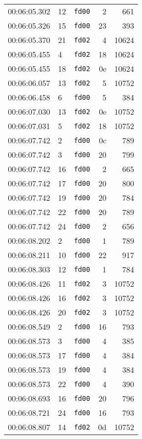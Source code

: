 \documentclass{article}
\begin{document}
\begin{longtable}{lllrr}
00:06:05.302 & 12 & \texttt{fd00} & 2 & 661 \\
00:06:05.326 & 15 & \texttt{fd00} & 23 & 393 \\
00:06:05.370 & 21 & \texttt{fd02} & 4 & 10624 \\
00:06:05.455 & 4 & \texttt{fd02} & 18 & 10624 \\
00:06:05.455 & 18 & \texttt{fd02} & 0e & 10624 \\
00:06:06.057 & 13 & \texttt{fd02} & 5 & 10752 \\
00:06:06.458 & 6 & \texttt{fd00} & 5 & 384 \\
00:06:07.030 & 13 & \texttt{fd02} & 0e & 10752 \\
00:06:07.031 & 5 & \texttt{fd02} & 18 & 10752 \\
00:06:07.742 & 2 & \texttt{fd00} & 0c & 789 \\
00:06:07.742 & 3 & \texttt{fd00} & 20 & 799 \\
00:06:07.742 & 16 & \texttt{fd00} & 2 & 665 \\
00:06:07.742 & 17 & \texttt{fd00} & 20 & 800 \\
00:06:07.742 & 19 & \texttt{fd00} & 20 & 784 \\
00:06:07.742 & 22 & \texttt{fd00} & 20 & 789 \\
00:06:07.742 & 24 & \texttt{fd00} & 2 & 656 \\
00:06:08.202 & 2 & \texttt{fd00} & 1 & 789 \\
00:06:08.211 & 10 & \texttt{fd00} & 22 & 917 \\
00:06:08.303 & 12 & \texttt{fd00} & 1 & 784 \\
00:06:08.426 & 11 & \texttt{fd02} & 3 & 10752 \\
00:06:08.426 & 16 & \texttt{fd02} & 3 & 10752 \\
00:06:08.426 & 20 & \texttt{fd02} & 3 & 10752 \\
00:06:08.549 & 2 & \texttt{fd00} & 16 & 793 \\
00:06:08.573 & 3 & \texttt{fd00} & 4 & 385 \\
00:06:08.573 & 17 & \texttt{fd00} & 4 & 384 \\
00:06:08.573 & 19 & \texttt{fd00} & 4 & 384 \\
00:06:08.573 & 22 & \texttt{fd00} & 4 & 390 \\
00:06:08.693 & 16 & \texttt{fd00} & 20 & 796 \\
00:06:08.721 & 24 & \texttt{fd00} & 16 & 793 \\
00:06:08.807 & 14 & \texttt{fd02} & 0d & 10752 \\

\end{longtable}
\end{document}

